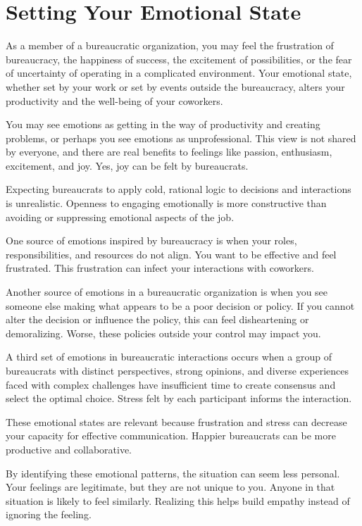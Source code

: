 \section{Setting Your Emotional State}

As a member of a bureaucratic organization, you may feel the frustration of bureaucracy, the happiness of success, the excitement of possibilities, or the fear of uncertainty of operating in a complicated environment. Your emotional state, whether set by your work or set by events outside the bureaucracy, alters your productivity and the well-being of your coworkers. 

You may see emotions as getting in the way of productivity and creating problems, or perhaps you see emotions as unprofessional. This view is not shared by everyone, and there are real benefits to feelings like passion, enthusiasm, excitement, and joy. Yes, joy can be felt by bureaucrats. 

Expecting bureaucrats to apply cold, rational logic to decisions and interactions is unrealistic. Openness to engaging emotionally is more constructive than avoiding or suppressing emotional aspects of the job. 

One source of emotions inspired by bureaucracy is when your roles, responsibilities, and resources do not align. You want to be effective and feel frustrated. This frustration can infect your interactions with coworkers. 

Another source of emotions in a bureaucratic organization is when you see someone else making what appears to be a poor decision or policy. If you cannot alter the decision or influence the policy, this can feel disheartening or demoralizing. Worse, these policies outside your control may impact you. 

A third set of emotions in bureaucratic interactions occurs when a group of bureaucrats with distinct perspectives, strong opinions, and diverse experiences faced with complex challenges have insufficient time to create consensus and select the optimal choice. Stress felt by each participant informs the interaction. 

These emotional states are relevant because frustration and stress can decrease your capacity for effective communication. Happier bureaucrats can be more productive and collaborative. 

By identifying these emotional patterns, the situation can seem less personal. Your feelings are legitimate, but they are not unique to you. Anyone in that situation is likely to feel similarly. Realizing this helps build empathy instead of ignoring the feeling. 